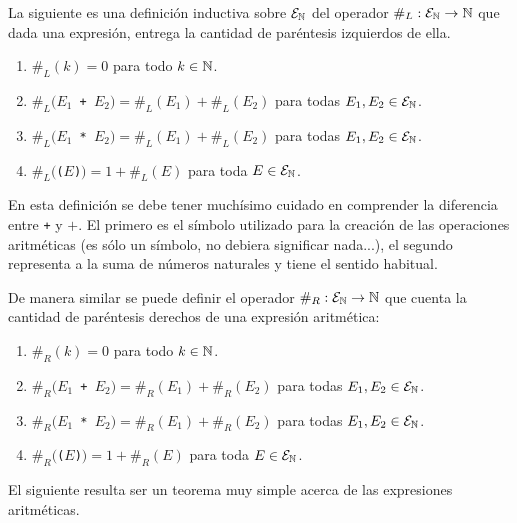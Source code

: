 	\begin{ejemplo}
	La siguiente es una definición inductiva sobre $\mathcal{E}_{\mathbb{N}}$ del operador $\#_L:\mathcal{E}_{\mathbb{N}}\rightarrow\mathbb{N}$ que dada una expresión, entrega la cantidad de paréntesis izquierdos de ella.
	\begin{enumerate}
	\itemsep 0pt
		\item $\#_L(k)=0$ para todo $k\in\mathbb{N}$.
		\item $\#_L(E_1$\texttt{ + }$E_2)=\#_L(E_1)+\#_L(E_2)$ \hspace*{1em}para todas $E_1,E_2\in\mathcal{E}_{\mathbb{N}}$.
		\item $\#_L(E_1$\texttt{ * }$E_2)=\#_L(E_1)+\#_L(E_2)$ \hspace*{1em}para todas $E_1,E_2\in\mathcal{E}_{\mathbb{N}}$.
		\item $\#_L($\texttt{($E$)}$)=1+\#_L(E)$ \hspace*{1em}para toda $E\in\mathcal{E}_{\mathbb{N}}$.
	\end{enumerate}
	En esta definición se debe tener muchísimo cuidado en comprender la diferencia entre \texttt{+} y $+$.
	El primero es el símbolo utilizado para la creación de las operaciones aritméticas (es sólo un símbolo, no debiera significar nada...), el segundo representa a la suma de números naturales y tiene el sentido habitual.
	
	De manera similar se puede definir el operador $\#_R:\mathcal{E}_{\mathbb{N}}\rightarrow\mathbb{N}$ que cuenta la cantidad de paréntesis derechos de una expresión aritmética:
	\begin{enumerate}
	\itemsep 0pt
		\item $\#_R(k)=0$ para todo $k\in\mathbb{N}$.
		\item $\#_R(E_1$\texttt{ + }$E_2)=\#_R(E_1)+\#_R(E_2)$ \hspace*{1em}para todas $E_1,E_2\in\mathcal{E}_{\mathbb{N}}$.
		\item $\#_R(E_1$\texttt{ * }$E_2)=\#_R(E_1)+\#_R(E_2)$ \hspace*{1em}para todas $E_1,E_2\in\mathcal{E}_{\mathbb{N}}$.
		\item $\#_R($\texttt{($E$)}$)=1+\#_R(E)$ \hspace*{1em}para toda $E\in\mathcal{E}_{\mathbb{N}}$.
	\end{enumerate}
	\end{ejemplo}
	
	El siguiente resulta ser un teorema muy simple acerca de las expresiones aritméticas.
	
